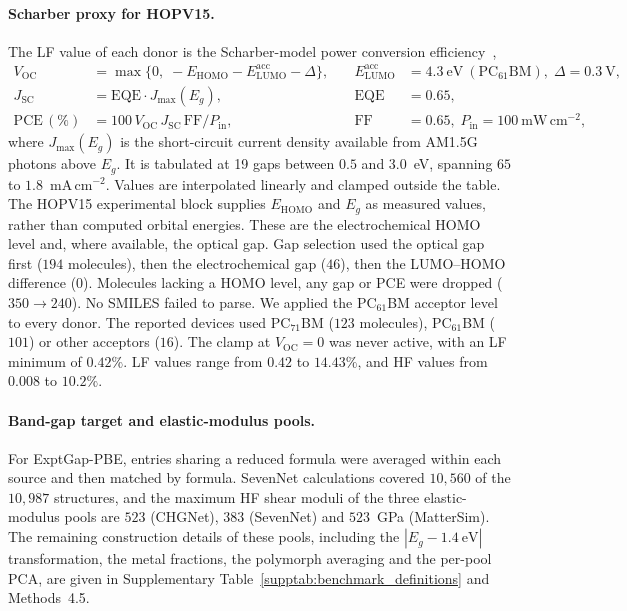\paragraph{Scharber proxy for HOPV15.}
The LF value of each donor is the Scharber-model power conversion efficiency~\citep{scharber2006design},
\begin{equation}
\begin{aligned}
V_{\mathrm{OC}} &= \max\{0,\; -E_{\mathrm{HOMO}} - E^{\mathrm{acc}}_{\mathrm{LUMO}} - \Delta\}, &\quad E^{\mathrm{acc}}_{\mathrm{LUMO}} &= 4.3~\mathrm{eV}~(\mathrm{PC}_{61}\mathrm{BM}),\; \Delta = 0.3~\mathrm{V},\\
J_{\mathrm{SC}} &= \mathrm{EQE}\cdot J_{\max}(E_g), &\quad \mathrm{EQE} &= 0.65,\\
\mathrm{PCE}\,(\%) &= 100\, V_{\mathrm{OC}}\, J_{\mathrm{SC}}\,\mathrm{FF}/P_{\mathrm{in}}, &\quad \mathrm{FF} &= 0.65,\; P_{\mathrm{in}} = 100~\mathrm{mW\,cm^{-2}},
\end{aligned}
\end{equation}
where $J_{\max}(E_g)$ is the short-circuit current density available from AM1.5G photons above $E_g$. It is tabulated at 19 gaps between $0.5$ and $3.0$~eV, spanning $65$ to $1.8$~mA\,cm$^{-2}$. Values are interpolated linearly and clamped outside the table. The HOPV15 experimental block supplies $E_{\mathrm{HOMO}}$ and $E_g$ as measured values, rather than computed orbital energies. These are the electrochemical HOMO level and, where available, the optical gap. Gap selection used the optical gap first ($194$ molecules), then the electrochemical gap ($46$), then the LUMO--HOMO difference ($0$). Molecules lacking a HOMO level, any gap or PCE were dropped ($350 \to 240$). No SMILES failed to parse. We applied the PC$_{61}$BM acceptor level to every donor. The reported devices used PC$_{71}$BM ($123$ molecules), PC$_{61}$BM ($101$) or other acceptors ($16$). The clamp at $V_{\mathrm{OC}} = 0$ was never active, with an LF minimum of $0.42\%$. LF values range from $0.42$ to $14.43\%$, and HF values from $0.008$ to $10.2\%$.

\paragraph{Band-gap target and elastic-modulus pools.}
For ExptGap-PBE, entries sharing a reduced formula were averaged within each source and then matched by formula. SevenNet calculations covered $10{,}560$ of the $10{,}987$ structures, and the maximum HF shear moduli of the three elastic-modulus pools are $523$ (CHGNet), $383$ (SevenNet) and $523$~GPa (MatterSim). The remaining construction details of these pools, including the $|E_g - 1.4~\mathrm{eV}|$ transformation, the metal fractions, the polymorph averaging and the per-pool PCA, are given in Supplementary Table~\ref{supptab:benchmark_definitions} and Methods~4.5.

